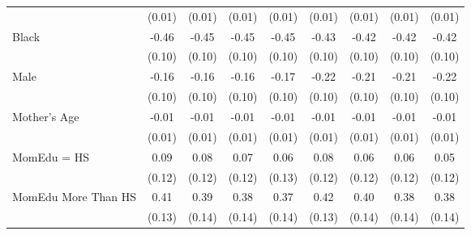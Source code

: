 {\begin{tabular}{l*{8}{c}}
                    &      (0.01)         &      (0.01)         &      (0.01)         &      (0.01)         &      (0.01)         &      (0.01)         &      (0.01)         &      (0.01)         \\
[1em]
Black               &       -0.46\sym{***}&       -0.45\sym{***}&       -0.45\sym{***}&       -0.45\sym{***}&       -0.43\sym{***}&       -0.42\sym{***}&       -0.42\sym{***}&       -0.42\sym{***}\\
                    &      (0.10)         &      (0.10)         &      (0.10)         &      (0.10)         &      (0.10)         &      (0.10)         &      (0.10)         &      (0.10)         \\
[1em]
Male                &       -0.16         &       -0.16         &       -0.16\sym{*}  &       -0.17\sym{*}  &       -0.22\sym{**} &       -0.21\sym{**} &       -0.21\sym{**} &       -0.22\sym{**} \\
                    &      (0.10)         &      (0.10)         &      (0.10)         &      (0.10)         &      (0.10)         &      (0.10)         &      (0.10)         &      (0.10)         \\
[1em]
Mother's Age        &       -0.01         &       -0.01         &       -0.01         &       -0.01         &       -0.01         &       -0.01         &       -0.01         &       -0.01         \\
                    &      (0.01)         &      (0.01)         &      (0.01)         &      (0.01)         &      (0.01)         &      (0.01)         &      (0.01)         &      (0.01)         \\
[1em]
MomEdu = HS         &        0.09         &        0.08         &        0.07         &        0.06         &        0.08         &        0.06         &        0.06         &        0.05         \\
                    &      (0.12)         &      (0.12)         &      (0.12)         &      (0.13)         &      (0.12)         &      (0.12)         &      (0.12)         &      (0.12)         \\
[1em]
MomEdu More Than HS &        0.41\sym{***}&        0.39\sym{***}&        0.38\sym{***}&        0.37\sym{***}&        0.42\sym{***}&        0.40\sym{***}&        0.38\sym{***}&        0.38\sym{***}\\
                    &      (0.13)         &      (0.14)         &      (0.14)         &      (0.14)         &      (0.13)         &      (0.14)         &      (0.14)         &      (0.14)         \\

\end{tabular}}
